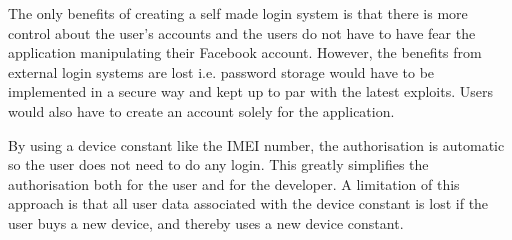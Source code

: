 The only benefits of creating a self made login system is that there is more control about the user's accounts and the users do not have to have fear the application manipulating their Facebook account. However, the benefits from external login systems are lost i.e. password storage would have to be implemented in a secure way and kept up to par with the latest exploits. Users would also have to create an account solely for the application.

By using a device constant like the IMEI number, the authorisation is automatic so the user does not need to do any login. This greatly simplifies the authorisation both for the user and for the developer. A limitation of this approach is that all user data associated with the device constant is lost if the user buys a new device, and thereby uses a new device constant.